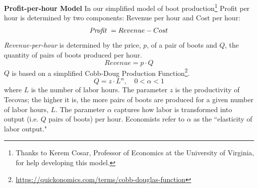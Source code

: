 \documentclass[11pt]{article}
\begin{document}
\pagestyle{otherpages}
\thispagestyle{firstpage}
\vspace*{.65in}



{\bf Profit-per-hour Model}
In our simplified model of boot production\footnote{Thanks to Kerem Cosar, Professor of Economics at the University of Virginia, for help developing this model.} Profit per hour is determined by two components: Revenue per hour and Cost per hour:
$$\text{\em Profit }= Revenue - Cost$$
{\em Revenue-per-hour} is determined by the price, $p$, of a pair of boots and $Q$, the quantity  of pairs of boots produced  per hour. $$Revenue=p\cdot Q$$
$Q$ is based on a simplified Cobb-Doug Production Function\footnote{\url{https://quickonomics.com/terms/cobb-douglas-function}}.
$$Q=z\cdot L^{\alpha},\quad 0<\alpha<1$$ where $L$ is the number of labor hours.  The parameter $z$ is the productivity of Tecovas;  the higher it is, the more pairs of boots are produced for a given number of labor hours, $L$.  The parameter $\alpha$ captures how labor is transformed into output (i.e. $Q$ pairs of boots) per hour. Economists  refer to $\alpha$ as the ``elasticity of labor output."
\\
\end{document}
